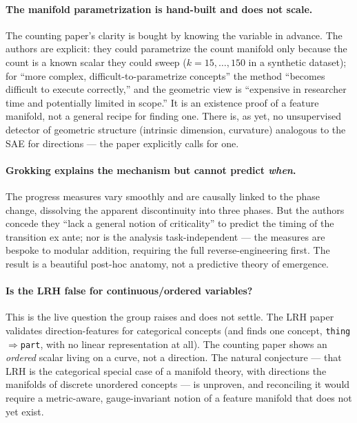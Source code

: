 \paragraph*{The manifold parametrization is hand-built and does not scale.}
The counting paper's clarity is bought by knowing the variable in advance. The authors are explicit: they could parametrize the count manifold only because the count is a known scalar they could sweep ($k=15,\dots,150$ in a synthetic dataset); for ``more complex, difficult-to-parametrize concepts'' the method ``becomes difficult to execute correctly,'' and the geometric view is ``expensive in researcher time and potentially limited in scope.'' It is an existence proof of a feature manifold, not a general recipe for finding one. There is, as yet, no unsupervised detector of geometric structure (intrinsic dimension, curvature) analogous to the SAE for directions --- the paper explicitly calls for one.

\paragraph*{Grokking explains the mechanism but cannot predict \emph{when}.}
The progress measures vary smoothly and are causally linked to the phase change, dissolving the apparent discontinuity into three phases. But the authors concede they ``lack a general notion of criticality'' to predict the timing of the transition ex ante; nor is the analysis task-independent --- the measures are bespoke to modular addition, requiring the full reverse-engineering first. The result is a beautiful post-hoc anatomy, not a predictive theory of emergence.

\paragraph*{Is the LRH false for continuous/ordered variables?}
This is the live question the group raises and does not settle. The LRH paper validates direction-features for categorical concepts (and finds one concept, \texttt{thing}$\Rightarrow$\texttt{part}, with no linear representation at all). The counting paper shows an \emph{ordered} scalar living on a curve, not a direction. The natural conjecture --- that LRH is the categorical special case of a manifold theory, with directions the manifolds of discrete unordered concepts --- is unproven, and reconciling it would require a metric-aware, gauge-invariant notion of a feature manifold that does not yet exist.


